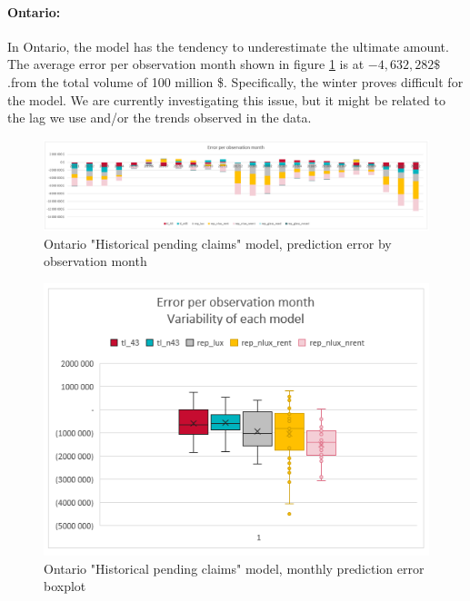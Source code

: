 	\paragraph{Ontario:}
		In Ontario, the model has the tendency to underestimate the ultimate amount. The average error per observation month shown in figure \ref{Fig_ON_current_er_by_month} is at $-4,632,282\$ $.from the total volume of 100 million \$. Specifically, the winter proves difficult for the model. We are currently investigating this issue, but it might be related to the lag we use and/or the trends observed in the data.
		\begin{figure}[H]
			\begin{center}
				\includegraphics[scale=0.4]{Graphiques/ON_current_model_by_month} 
				\renewcommand{\figurename}{Figure}
				\caption[Ontario version one model error]{Ontario "Historical pending claims" model, prediction error by observation month}\label{Fig_ON_current_er_by_month}
			\end{center}
		\end{figure}
		\begin{figure}[H]
			\begin{center}
				\includegraphics[scale=0.4]{Graphiques/ON_current_model_mustach} 
				\renewcommand{\figurename}{Figure}
				\caption[Ontario version one model error - boxplot]{Ontario "Historical pending claims" model, monthly prediction error boxplot}\label{Fig_ON_current_er_boxplot}
			\end{center}
		\end{figure}

